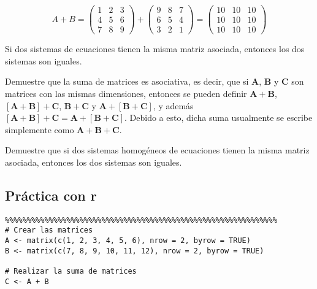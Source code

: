 \begin{}
\begin{example}
\[ A + B = \begin{pmatrix}
1 & 2 & 3 \\
4 & 5 & 6 \\
7 & 8 & 9
\end{pmatrix} + \begin{pmatrix}
9 & 8 & 7 \\
6 & 5 & 4 \\
3 & 2 & 1
\end{pmatrix} = \begin{pmatrix}
10 & 10 & 10 \\
10 & 10 & 10 \\
10 & 10 & 10
\end{pmatrix} \]   
\end{example}
\begin{exercise}
 Si dos sistemas de ecuaciones tienen la misma matriz asociada,
entonces los dos sistemas son iguales.   
\end{exercise}
\begin{exercise}
    Demuestre que la suma de matrices es asociativa, es decir, que si \( \boldsymbol{A} \), \( \boldsymbol{B} \) y \( \boldsymbol{C} \) son matrices con las mismas dimensiones, entonces se pueden definir \( \boldsymbol{A} + \boldsymbol{B} \), \( [\boldsymbol{A} + \boldsymbol{B}] + \boldsymbol{C} \), \( \boldsymbol{B} + \boldsymbol{C} \) y \( \boldsymbol{A} + [\boldsymbol{B} + \boldsymbol{C}] \), y además \( [\boldsymbol{A} + \boldsymbol{B}] + \boldsymbol{C} = \boldsymbol{A} + [\boldsymbol{B} + \boldsymbol{C}] \). Debido a esto, dicha suma usualmente se escribe simplemente como \( \boldsymbol{A} + \boldsymbol{B} + \boldsymbol{C} \).
\end{exercise}
\begin{exercise}
 Demuestre que si dos sistemas homogéneos de ecuaciones tienen la misma matriz asociada, entonces los dos sistemas son iguales.
\end{exercise}
\subsection{Práctica con r}
\begin{verbatim}
%%%%%%%%%%%%%%%%%%%%%%%%%%%%%%%%%%%%%%%%%%%%%%%%%%%%%%%%%%%%%%
# Crear las matrices
A <- matrix(c(1, 2, 3, 4, 5, 6), nrow = 2, byrow = TRUE)
B <- matrix(c(7, 8, 9, 10, 11, 12), nrow = 2, byrow = TRUE)

# Realizar la suma de matrices
C <- A + B


\end{verbatim}
\end{}
